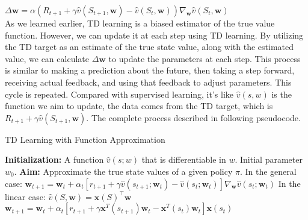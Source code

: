 \documentclass{article}
\begin{document}
\hspace*{\fill}

$\Delta \mathbf{w}=\alpha\left(R_{t+1}+\gamma \hat{v}\left(S_{t+1}, \mathbf{w}\right)-\hat{v}\left(S_t, \mathbf{w}\right)\right) \nabla_{\mathbf{w}} \hat{v}\left(S_t, \mathbf{w}\right)$\\

As we learned earlier, TD learning is a biased estimator of the true value function. However, we can update it at each step using TD learning. By utilizing the TD target as an estimate of the true state value, along with the estimated value, we can calculate $\Delta \mathbf{w}$ to update the parameters at each step. This process is similar to making a prediction about the future, then taking a step forward, receiving actual feedback, and using that feedback to adjust parameters. This cycle is repeated. Compared with supervised learning, it’s like $\hat v(s,w)$ is the function we aim to update, the data comes from the TD target, which is $R_{t+1}+\gamma \hat{v}\left(S_{t+1}, \mathbf{w}\right) $. The complete process described in following pseudocode.\\

\begin{algorithm}
  \caption{TD Learning with Function Approximation}\label{alg:td_learning}
  \begin{algorithmic}
    \State \textbf{Initialization:} A function $\hat{v}{(s; w)}$ that is differentiable in $w$.
     \State Initial parameter $w_0$.
    \State \textbf{Aim:} Approximate the true state values of a given policy $\pi$.
        \State In the general case:
        \State $\mathbf{w}_{t+1} = \mathbf{w}_t + \alpha_t \left[ r_{t+1} + \gamma \hat{v}{(s_{t+1}; \mathbf{w}_t)} - \hat{v}{(s_t; \mathbf{w}_t)} \right] \nabla_\mathbf{w} \hat{v}{(s_t; \mathbf{w}_t)}$
        \State In the linear case:
        \State $\hat{v}(S, \mathbf{w})=\mathbf{x}(S)^{\top} \mathbf{w} $
        \State $\mathbf{w}_{t+1} = \mathbf{w}_t + \alpha_t \left[ r_{t+1} + \gamma \mathbf{x}^T(s_{t+1})\mathbf{w}_t - \mathbf{x}^T(s_t)\mathbf{w}_t \right]\mathbf{x}(s_t)$
      \EndFor
    \EndFor
  \end{algorithmic}
\end{algorithm}
\end{document}
